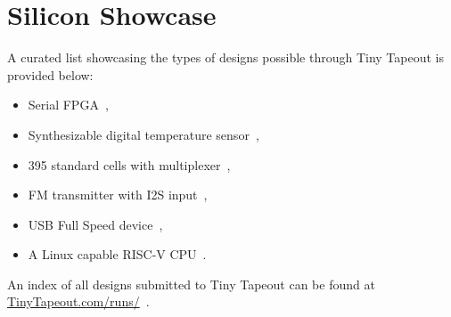 \section{Silicon Showcase}
\label{sec:silicon_showcase}

A curated list showcasing the types of designs possible through Tiny Tapeout is provided below:

\begin{itemize}
    \item Serial FPGA~\cite{showcaseserialfpga},
    \item Synthesizable digital temperature sensor~\cite{showcasetempsense},
    \item 395 standard cells with multiplexer~\cite{showcasemicrotapeout},
    \item FM transmitter with I2S input~\cite{showcasefmtx},
    \item USB Full Speed device~\cite{showcaseusb},
    \item A Linux capable RISC-V CPU~\cite{showcasekianv}.
\end{itemize}

An index of all designs submitted to Tiny Tapeout can be found at \url{TinyTapeout.com/runs/}~\cite{tinytapeoutruns}.
